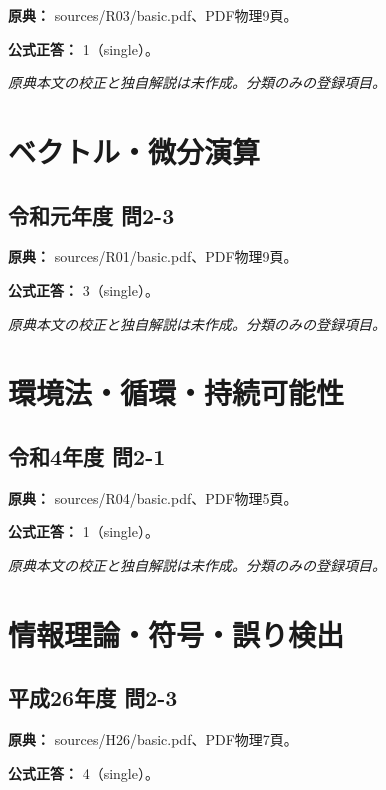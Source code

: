 \noindent\textbf{原典：} sources/R03/basic.pdf、PDF物理9頁。

\textbf{公式正答：} 1（single）。

\par\textit{原典本文の校正と独自解説は未作成。分類のみの登録項目。}

\section{ベクトル・微分演算}

\subsection{令和元年度 問2-3}
\label{q:r01-reg-basic-2-3}

\noindent\textbf{原典：} sources/R01/basic.pdf、PDF物理9頁。

\textbf{公式正答：} 3（single）。

\par\textit{原典本文の校正と独自解説は未作成。分類のみの登録項目。}

\section{環境法・循環・持続可能性}

\subsection{令和4年度 問2-1}
\label{q:r04-reg-basic-2-1}

\noindent\textbf{原典：} sources/R04/basic.pdf、PDF物理5頁。

\textbf{公式正答：} 1（single）。

\par\textit{原典本文の校正と独自解説は未作成。分類のみの登録項目。}

\section{情報理論・符号・誤り検出}

\subsection{平成26年度 問2-3}
\label{q:h26-reg-basic-2-3}

\noindent\textbf{原典：} sources/H26/basic.pdf、PDF物理7頁。

\textbf{公式正答：} 4（single）。

